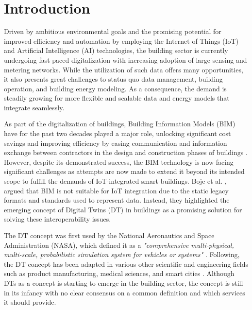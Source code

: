 \section{Introduction}
\label{sec:Introduction}

Driven by ambitious environmental goals and the promising potential for improved efficiency and automation by employing the Internet of Things (IoT) and Artificial Intelligence (AI) technologies, the building sector is currently undergoing fast-paced digitalization with increasing adoption of large sensing and metering networks. While the utilization of such data offers many opportunities, it also presents great challenges to status quo data management, building operation, and building energy modeling. As a consequence, the demand is steadily growing for more flexible and scalable data and energy models that integrate seamlessly. 

As part of the digitalization of buildings, Building Information Models (BIM) have for the past two decades played a major role, unlocking significant cost savings and improving efficiency by easing communication and information exchange between contractors in the design and construction phases of buildings \cite{ullah2019}. However, despite its demonstrated success, the BIM technology is now facing significant challenges as attempts are now made to extend it beyond its intended scope to fulfill the demands of IoT-integrated smart buildings. Boje et al. \cite{BOJE2020103179}, argued that BIM is not suitable for IoT integration due to the static legacy formats and standards used to represent data. Instead, they highlighted the emerging concept of Digital Twins (DT) in buildings as a promising solution for solving these interoperability issues. 


The DT concept was first used by the National Aeronautics and Space Administration (NASA), which defined it as a \textit{"comprehensive multi-physical, multi-scale, probabilistic simulation system for vehicles or systems"} \cite{Glaessgen2012}. Following, the DT concept has been adapted in various other scientific and engineering fields such as product manufacturing, medical sciences, and smart cities \cite{Guo2022}. Although DTs as a concept is starting to emerge in the building sector, the concept is still in its infancy with no clear consensus on a common definition and which services it should provide. 




